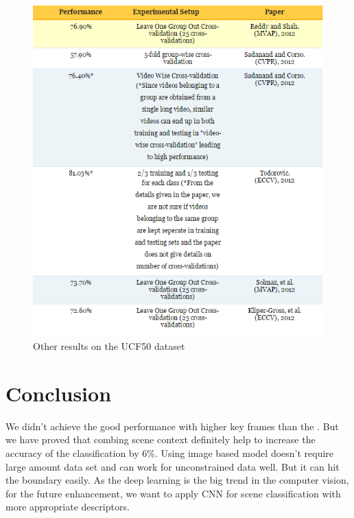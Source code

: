 \documentclass{sig-alternate-05-2015}
\begin{document}
\begin{figure}[h]
 \centering
  \includegraphics[scale=0.5]{fig/other_result.png}
  \caption{Other results on the UCF50 dataset}
  \label{fig:other_result}
\end{figure}

\section{Conclusion}\label{sec:con}
We didn't achieve the good performance with higher key frames than the \cite{Reddy:2013:RHA:2508580.2508584}. But we have proved that combing scene context definitely help to increase the accuracy of the classification by $6\%$. Using image based model doesn't require large amount data set and can work for unconstrained data well. But it can hit the boundary easily. As the deep learning is the big trend in the computer vision, for the future enhancement, we want to apply CNN for scene classification with more appropriate descriptors. 






\clearpage
\end{document}
